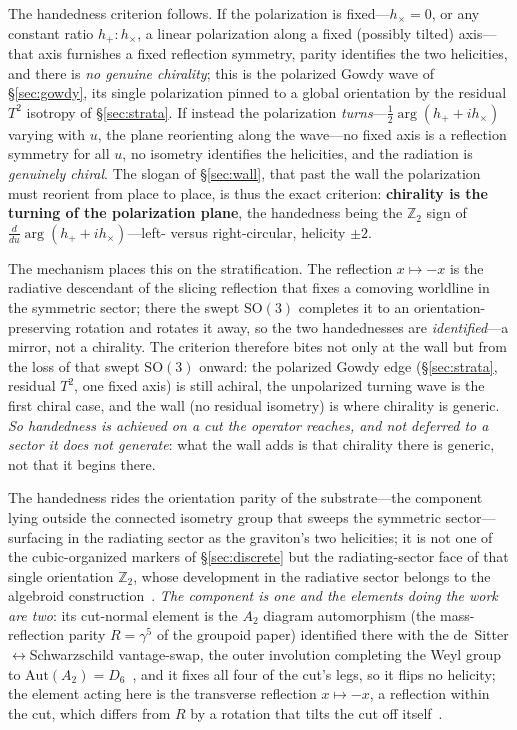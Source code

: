 \documentclass[11pt,a4paper]{article}
\theoremstyle{plain}
\theoremstyle{definition}
\theoremstyle{remark}
\begin{document}
The handedness criterion follows. If the polarization is fixed---$h_\times=0$, or any constant ratio $h_+:h_\times$, a linear polarization along a fixed (possibly tilted) axis---that axis furnishes a fixed reflection symmetry, parity identifies the two helicities, and there is \emph{no genuine chirality}; this is the polarized Gowdy wave of \S\ref{sec:gowdy}, its single polarization pinned to a global orientation by the residual $T^2$ isotropy of \S\ref{sec:strata}. If instead the polarization \emph{turns}---$\tfrac12\arg(h_++ih_\times)$ varying with $u$, the plane reorienting along the wave---no fixed axis is a reflection symmetry for all $u$, no isometry identifies the helicities, and the radiation is \emph{genuinely chiral}. The slogan of \S\ref{sec:wall}, that past the wall the polarization must reorient from place to place, is thus the exact criterion: \textbf{chirality is the turning of the polarization plane}, the handedness being the $\mathbb{Z}_2$ sign of $\tfrac{d}{du}\arg(h_++ih_\times)$---left- versus right-circular, helicity $\pm2$.

The mechanism places this on the stratification. The reflection $x\mapsto-x$ is the radiative descendant of the slicing reflection that fixes a comoving worldline in the symmetric sector; there the swept $\mathrm{SO}(3)$ completes it to an orientation-preserving rotation and rotates it away, so the two handednesses are \emph{identified}---a mirror, not a chirality. The criterion therefore bites not only at the wall but from the loss of that swept $\mathrm{SO}(3)$ onward: the polarized Gowdy edge (\S\ref{sec:strata}, residual $T^2$, one fixed axis) is still achiral, the unpolarized turning wave is the first chiral case, and the wall (no residual isometry) is where chirality is generic. \emph{So handedness is achieved on a cut the operator reaches, and not deferred to a sector it does not generate}: what the wall adds is that chirality there is generic, not that it begins there. 

The handedness rides the orientation parity of the substrate---the component lying outside the connected isometry group that sweeps the symmetric sector---surfacing in the radiating sector as the graviton's two helicities; it is not one of the cubic-organized markers of \S\ref{sec:discrete} but the radiating-sector face of that single orientation $\mathbb{Z}_2$, whose development in the radiative sector belongs to the algebroid construction~\cite{JanzenAlgebroid}. \emph{The component is one and the elements doing the work are two}: its cut-normal element is the $A_2$ diagram automorphism (the mass-reflection parity $R=\gamma^5$ of the groupoid paper) identified there with the de~Sitter$\leftrightarrow$Schwarzschild vantage-swap, the outer involution completing the Weyl group to $\mathrm{Aut}(A_2)=D_6$~\cite{JanzenGroupoid}, and it fixes all four of the cut's legs, so it flips no helicity; the element acting here is the transverse reflection $x\mapsto-x$, a reflection within the cut, which differs from $R$ by a rotation that tilts the cut off itself~\cite{JanzenAlgebroid,JanzenMatter}. 
\end{document}
